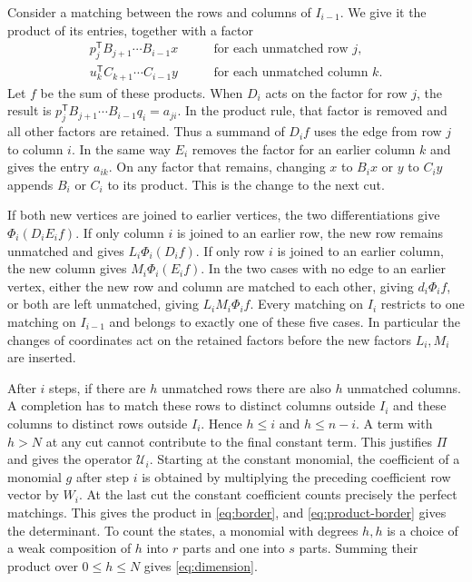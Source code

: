 \documentclass[11pt,reqno]{amsart}
\theoremstyle{remark}
\numberwithin{equation}{section}
\begin{document}
Consider a matching between the rows and columns of \(I_{i-1}\). We give
it the product of its entries, together with a factor
\[
 \begin{aligned}
 p_j^{\mathsf T}B_{j+1}\cdots B_{i-1}x
   &\qquad\text{for each unmatched row }j,\\
 u_k^{\mathsf T}C_{k+1}\cdots C_{i-1}y
   &\qquad\text{for each unmatched column }k.
 \end{aligned}
\]
Let \(f\) be the sum of these products. When \(D_i\) acts on the factor
for row \(j\), the result is \(p_j^{\mathsf T}B_{j+1}\cdots
B_{i-1}q_i=a_{ji}\). In the product rule, that factor is removed and all
other factors are retained. Thus a summand of \(D_i f\) uses the edge
from row \(j\) to column \(i\). In the same way \(E_i\) removes the
factor for an earlier column \(k\) and gives the entry \(a_{ik}\). On any
factor that remains, changing \(x\) to \(B_i x\) or \(y\) to \(C_i y\)
appends \(B_i\) or \(C_i\) to its product. This is the change to the next
cut.

If both new vertices are joined to earlier vertices, the two
differentiations give \(\Phi_i(D_iE_i f)\). If only column \(i\) is
joined to an earlier row, the new row remains unmatched and gives
\(L_i\Phi_i(D_i f)\). If only row \(i\) is joined to an earlier column,
the new column gives \(M_i\Phi_i(E_i f)\). In the two cases with no edge
to an earlier vertex, either the new row and column are matched to each
other, giving \(d_i\Phi_i f\), or both are left unmatched, giving
\(L_iM_i\Phi_i f\). Every matching on \(I_i\) restricts to one matching
on \(I_{i-1}\) and belongs to exactly one of these five cases. In
particular the changes of coordinates act on the retained factors before
the new factors \(L_i,M_i\) are inserted.

After \(i\) steps, if there are \(h\) unmatched rows there are also \(h\)
unmatched columns. A completion has to match these rows to distinct
columns outside \(I_i\) and these columns to distinct rows outside
\(I_i\). Hence \(h\leq i\) and \(h\leq n-i\). A term with \(h>N\) at any
cut cannot contribute to the final constant term. This justifies \(\Pi\)
and gives the operator \(\mathcal U_i\). Starting at the constant
monomial, the coefficient of a monomial \(g\) after step \(i\) is
obtained by multiplying the preceding coefficient row vector by \(W_i\).
At the last cut the constant coefficient counts precisely the perfect
matchings. This gives the product in \eqref{eq:border}, and
\eqref{eq:product-border} gives the determinant. To count the states, a
monomial with degrees \(h,h\) is a choice of a weak composition of \(h\)
into \(r\) parts and one into \(s\) parts. Summing their product over
\(0\leq h\leq N\) gives \eqref{eq:dimension}.
\end{document}
